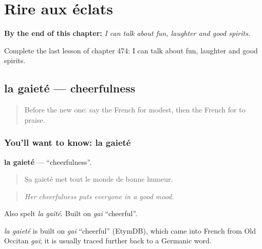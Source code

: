 
\chapter{Rire aux éclats}
\label{ch:fr-rire-aux-eclats}

\begin{chapteropening}
\textbf{By the end of this chapter:} \emph{I can talk about fun, laughter and good spirits.}

Complete the last lesson of chapter 474: I can talk about fun, laughter and good spirits.
\end{chapteropening}

\section[la gaieté]{la gaieté — cheerfulness}

\label{lesson:FR-C474-gaiete}



\begin{quote}
Before the new one: say the French for modest, then the French for to praise.
\end{quote}

\subsection*{You'll want to know: la gaieté}
\textbf{la gaieté} — \textquotedblleft{}cheerfulness\textquotedblright{}.

\begin{quote}
Sa gaieté met tout le monde de bonne humeur.
\end{quote}

\begin{quote}
\emph{Her cheerfulness puts everyone in a good mood.}
\end{quote}

Also spelt \emph{la gaîté}. Built on \emph{gai} \textquotedblleft{}cheerful\textquotedblright{}.

\begin{cousinweb}
\emph{la gaieté} is built on \emph{gai} \textquotedblleft{}cheerful\textquotedblright{} (EtymDB), which came into French from Old Occitan \emph{gai}; it is usually traced further back to a Germanic word.
\end{cousinweb}

